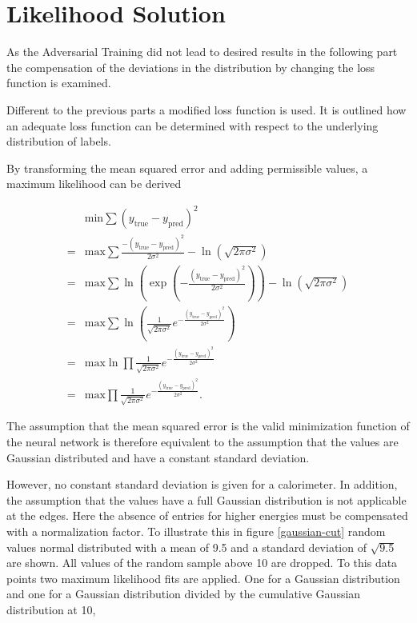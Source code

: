 \documentclass[12pt, a4paper]{thesis}
\begin{document}
\clearpage
\section{Likelihood Solution}
\label{sec:org05c2ceb}

As the Adversarial Training did not lead to desired results in the
following part the compensation of the deviations in the distribution
by changing the loss function is examined.

Different to the previous parts a modified loss function is used. It
is outlined how an adequate loss function can be determined with
respect to the underlying distribution of labels.

By transforming the mean squared error and adding permissible values,
a maximum likelihood can be derived

\begin{align}
    &\text{min} \sum (y_{\text{true}}-y_{\text{pred}})^2
  \\ =&\text{max} \sum\frac{-(y_{\text{true}}-y_{\text{pred}})^2}{2
    \sigma^2} - \ln(\sqrt{2\pi \sigma^2}) \\ = &\text{max} \sum
  \ln(\exp(-\frac{(y_{\text{true}}-y_{\text{pred}})^2}{2 \sigma^2})) -
  \ln(\sqrt{2\pi \sigma^2}) \\ = &\text{max} \sum \ln(
  \frac{1}{\sqrt{2\pi \sigma^2}}
  e^{-\frac{(y_{\text{true}}-y_{\text{pred}})^2}{2 \sigma^2}}) \\ =
  &\text{max} \ln \prod \frac{1}{\sqrt{2\pi \sigma^2}}
  e^{-\frac{(y_{\text{true}}-y_{\text{pred}})^2}{2 \sigma^2}}\\ =
  &\text{max} \prod \frac{1}{\sqrt{2\pi \sigma^2}}
  e^{-\frac{(y_{\text{true}}-y_{\text{pred}})^2}{2 \sigma^2}}.
\end{align}

The assumption that the mean squared error is the valid minimization
function of the neural network is therefore equivalent to the
assumption that the values are Gaussian distributed and have a
constant standard deviation.

However, no constant standard deviation is given for a calorimeter. In
addition, the assumption that the values have a full Gaussian
distribution is not applicable at the edges. Here the absence of
entries for higher energies must be compensated with a normalization
factor. To illustrate this in figure \ref{gaussian-cut} random values
normal distributed with a mean of 9.5 and a standard deviation of
$\sqrt{9.5}$ are shown. All values of the random sample above 10 are
dropped. To this data points two maximum likelihood fits are
applied. One for a Gaussian distribution and one for a Gaussian
distribution divided by the cumulative Gaussian distribution at 10,
\end{document}
